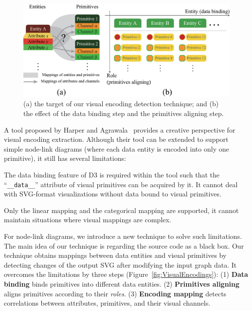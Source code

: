 \begin{figure}[ht]
    \centering
    \includegraphics[width=1\columnwidth]{figures/PrimitiveAligning.eps}
    \caption{(a) the target of our visual encoding detection technique; and (b) the effect of the data binding step and the primitives aligning step.}
    \label{fig:PrimitiveAligning}
\end{figure}

A tool proposed by Harper and Agrawala~\cite{DBLP:conf/uist/HarperA14} provides a creative perspective for visual encoding extraction.
Although their tool can be extended to support simple node-link diagrams (where each data entity is encoded into only one primitive), it still has several limitations:
\begin{compactenum}
\item The data binding feature of D3 is required within the tool such that the ``\texttt{\_\_data\_\_}'' attribute of visual primitives can be acquired by it. 
It cannot deal with SVG-format visualizations without data bound to visual primitives.

\item Only the linear mapping and the categorical mapping are supported, it cannot maintain situations where visual mappings are complex.
\end{compactenum}

For node-link diagrams, we introduce a new technique to solve such limitations.
The main idea of our technique is regarding the source code as a black box.
Our technique obtains mappings between data entities and visual primitives by detecting changes of the output SVG after modifying the input graph data.
It overcomes the limitations by three steps (Figure~\ref{fig:VisualEncodings}):
(1) \textbf{Data binding} binds primitives into different data entities.
(2) \textbf{Primitives aligning} aligns primitives according to their \textit{roles}. 
(3) \textbf{Encoding mapping} detects correlations between attributes, primitives, and their visual channels.

